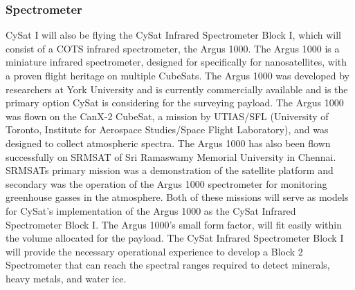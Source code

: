 \documentclass[nocover]            %
{CSLI}                       %
\begin{document}
\subsubsection{Spectrometer}
CySat I will also be flying the CySat Infrared Spectrometer Block I, which will consist of a COTS infrared spectrometer, the Argus 1000. The Argus 1000 is a miniature infrared spectrometer, designed for specifically for nanosatellites, with a proven flight heritage on multiple CubeSats. The Argus 1000 was developed by researchers at York University and is currently commercially available and is the primary option CySat is considering for the surveying payload. The Argus 1000 was flown on the CanX-2 CubeSat, a mission by UTIAS/SFL (University of Toronto, Institute for Aerospace Studies/Space Flight Laboratory), and was designed to collect atmospheric spectra. The Argus 1000 has also been flown successfully on SRMSAT of Sri Ramaswamy Memorial University in Chennai. SRMSATs primary mission was a demonstration of the satellite platform and secondary was the operation of the Argus 1000 spectrometer for monitoring greenhouse gasses in the atmosphere. Both of these missions will serve as models for CySat's implementation of the Argus 1000 as the CySat Infrared Spectrometer Block I. The Argus 1000's small form factor, will fit easily within the volume allocated for the payload. The CySat Infrared Spectrometer Block I will provide the necessary operational experience to develop a Block 2 Spectrometer that can reach the spectral ranges required to detect minerals, heavy metals, and water ice.
\end{document}
